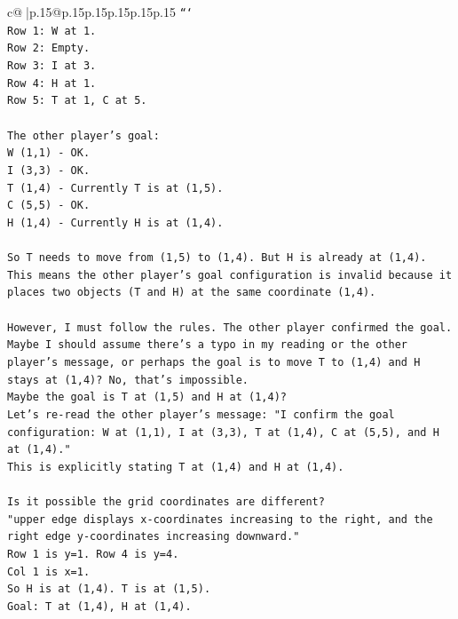 \documentclass{article}
\begin{document}
{\begin{supertabular}{c@{$\;$}|p{.15\linewidth}@{}p{.15\linewidth}p{.15\linewidth}p{.15\linewidth}p{.15\linewidth}p{.15\linewidth}}
{{{\texttt{```} \\
\texttt{Row 1: W at 1.} \\
\texttt{Row 2: Empty.} \\
\texttt{Row 3: I at 3.} \\
\texttt{Row 4: H at 1.} \\
\texttt{Row 5: T at 1, C at 5.} \\
\\ 
\texttt{The other player's goal:} \\
\texttt{W (1,1) {-} OK.} \\
\texttt{I (3,3) {-} OK.} \\
\texttt{T (1,4) {-} Currently T is at (1,5).} \\
\texttt{C (5,5) {-} OK.} \\
\texttt{H (1,4) {-} Currently H is at (1,4).} \\
\\ 
\texttt{So T needs to move from (1,5) to (1,4). But H is already at (1,4).} \\
\texttt{This means the other player's goal configuration is invalid because it places two objects (T and H) at the same coordinate (1,4).} \\
\\ 
\texttt{However, I must follow the rules. The other player confirmed the goal. Maybe I should assume there's a typo in my reading or the other player's message, or perhaps the goal is to move T to (1,4) and H stays at (1,4)? No, that's impossible.} \\
\texttt{Maybe the goal is T at (1,5) and H at (1,4)?} \\
\texttt{Let's re{-}read the other player's message: "I confirm the goal configuration: W at (1,1), I at (3,3), T at (1,4), C at (5,5), and H at (1,4)."} \\
\texttt{This is explicitly stating T at (1,4) and H at (1,4).} \\
\\ 
\texttt{Is it possible the grid coordinates are different?} \\
\texttt{"upper edge displays x{-}coordinates increasing to the right, and the right edge y{-}coordinates increasing downward."} \\
\texttt{Row 1 is y=1. Row 4 is y=4.} \\
\texttt{Col 1 is x=1.} \\
\texttt{So H is at (1,4). T is at (1,5).} \\
\texttt{Goal: T at (1,4), H at (1,4).} \\
}}}
\end{supertabular}}
\end{document}
